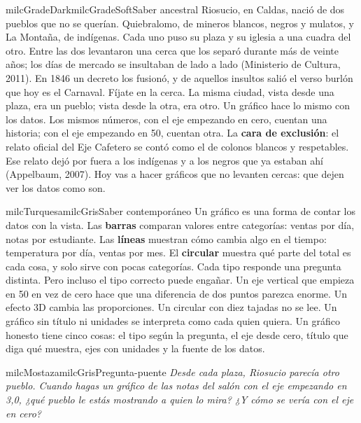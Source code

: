 \documentclass[11pt,letterpaper]{article}
\begin{document}
\begin{softbox}{milcGradeDark}{milcGradeSoft}{Saber ancestral}
Riosucio, en Caldas, nació de dos pueblos que no se querían. Quiebralomo, de mineros blancos, negros y mulatos, y La Montaña, de indígenas. Cada uno puso su plaza y su iglesia a una cuadra del otro. Entre las dos levantaron una cerca que los separó durante más de veinte años; los días de mercado se insultaban de lado a lado (Ministerio de Cultura, 2011). En 1846 un decreto los fusionó, y de aquellos insultos salió el verso burlón que hoy es el Carnaval. Fíjate en la cerca. La misma ciudad, vista desde una plaza, era un pueblo; vista desde la otra, era otro. Un gráfico hace lo mismo con los datos. Los mismos números, con el eje empezando en cero, cuentan una historia; con el eje empezando en 50, cuentan otra. La \textbf{cara de exclusión}: el relato oficial del Eje Cafetero se contó como el de colonos blancos y respetables. Ese relato dejó por fuera a los indígenas y a los negros que ya estaban ahí (Appelbaum, 2007). Hoy vas a hacer gráficos que no levanten cercas: que dejen ver los datos como son.\par{}
\end{softbox}

\begin{softbox}{milcTurquesa}{milcGris}{Saber contemporáneo}
Un gráfico es una forma de contar los datos con la vista. Las \textbf{barras} comparan valores entre categorías: ventas por día, notas por estudiante. Las \textbf{líneas} muestran cómo cambia algo en el tiempo: temperatura por día, ventas por mes. El \textbf{circular} muestra qué parte del total es cada cosa, y solo sirve con pocas categorías. Cada tipo responde una pregunta distinta. Pero incluso el tipo correcto puede engañar. Un eje vertical que empieza en 50 en vez de cero hace que una diferencia de dos puntos parezca enorme. Un efecto 3D cambia las proporciones. Un circular con diez tajadas no se lee. Un gráfico sin título ni unidades se interpreta como cada quien quiera. Un gráfico honesto tiene cinco cosas: el tipo según la pregunta, el eje desde cero, título que diga qué muestra, ejes con unidades y la fuente de los datos.
\end{softbox}

\begin{softbox}{milcMostaza}{milcGris}{Pregunta-puente}
\textit{Desde cada plaza, Riosucio parecía otro pueblo. Cuando hagas un gráfico de las notas del salón con el eje empezando en 3,0, ¿qué pueblo le estás mostrando a quien lo mira? ¿Y cómo se vería con el eje en cero?}
\end{softbox}
\end{document}
